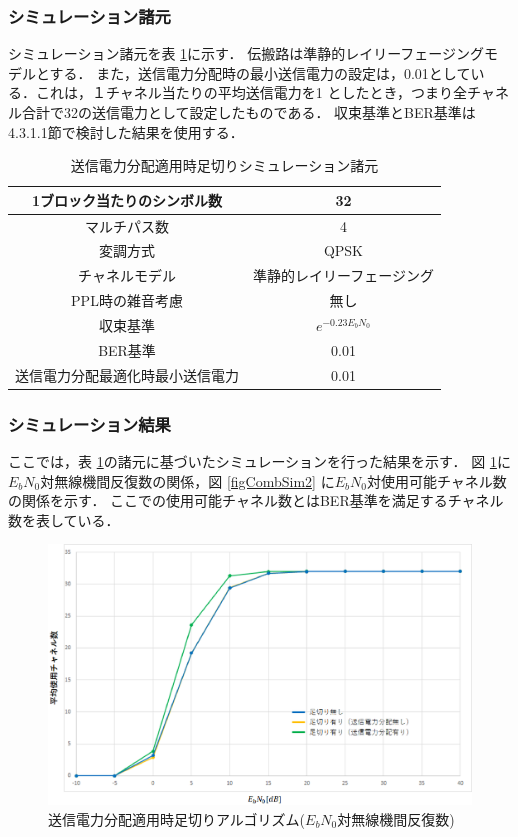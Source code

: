 \subsubsection{シミュレーション諸元}
シミュレーション諸元を表 \ref{tabComb1}に示す．
伝搬路は準静的レイリーフェージングモデルとする．
また，送信電力分配時の最小送信電力の設定は，0.01としている．これは，１チャネル当たりの平均送信電力を1
としたとき，つまり全チャネル合計で32の送信電力として設定したものである．
収束基準とBER基準は4.3.1.1節で検討した結果を使用する．

\begin{table}[t]
    \begin{tabular}{|c|c|} \hline
        1ブロック当たりのシンボル数 & 32 \\ \hline
        マルチパス数 & 4 \\ \hline
        変調方式 & QPSK \\ \hline
        チャネルモデル & 準静的レイリーフェージング \\ \hline
        PPL時の雑音考慮 & 無し \\ \hline
        収束基準 & $e^{-0.23E_bN_0}$ \\ \hline
        BER基準 & 0.01 \\ \hline
        送信電力分配最適化時最小送信電力 & 0.01 \\ \hline
    \end{tabular}
    \centering
    \caption{送信電力分配適用時足切りシミュレーション諸元}
    \label{tabComb1}
\end{table}

\subsubsection{シミュレーション結果}
ここでは，表 \ref{tabComb1}の諸元に基づいたシミュレーションを行った結果を示す．
図 \ref{figCombSim1}に$E_bN_0$対無線機間反復数の関係，図 \ref{figCombSim2}
に$E_bN_0$対使用可能チャネル数の関係を示す．
ここでの使用可能チャネル数とはBER基準を満足するチャネル数を表している．

\begin{figure}[t]
    \centering
    \includegraphics[width=0.95\linewidth]{chapter4/figure/CombSim1.eps}
    \caption{送信電力分配適用時足切りアルゴリズム($E_bN_0$対無線機間反復数)}
    \label{figCombSim1}
\end{figure}

